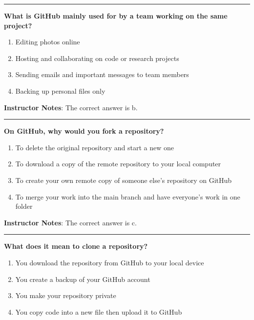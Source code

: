 \documentclass[
  letterpaper,
  DIV=11,
  numbers=noendperiod]{scrartcl}
\begin{document}
\begin{center}\rule{0.5\linewidth}{0.5pt}\end{center}

\textbf{What is GitHub mainly used for by a team working on the same
project?}

\begin{enumerate}
\def\labelenumi{\alph{enumi}.}
\item
  Editing photos online
\item
  Hosting and collaborating on code or research projects
\item
  Sending emails and important messages to team members
\item
  Backing up personal files only
\end{enumerate}

\textbf{Instructor Notes}: The correct answer is b.

\begin{center}\rule{0.5\linewidth}{0.5pt}\end{center}

\textbf{On GitHub, why would you fork a repository?}

\begin{enumerate}
\def\labelenumi{\alph{enumi}.}
\item
  To delete the original repository and start a new one
\item
  To download a copy of the remote repository to your local computer
\item
  To create your own remote copy of someone else's repository on GitHub
\item
  To merge your work into the main branch and have everyone's work in
  one folder
\end{enumerate}

\textbf{Instructor Notes}: The correct answer is c.

\begin{center}\rule{0.5\linewidth}{0.5pt}\end{center}

\textbf{What does it mean to clone a repository?}

\begin{enumerate}
\def\labelenumi{\alph{enumi}.}
\item
  You download the repository from GitHub to your local device
\item
  You create a backup of your GitHub account
\item
  You make your repository private
\item
  You copy code into a new file then upload it to GitHub
\end{enumerate}
\end{document}
